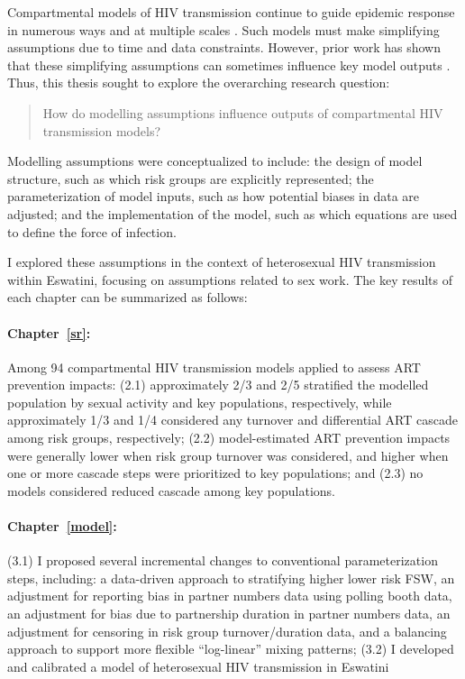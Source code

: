Compartmental models of HIV transmission
continue to guide epidemic response in numerous ways and at multiple scales
\cite{Stover2021,Phillips2022,TenBrink2022}.
Such models must make simplifying assumptions due to time and data constraints.
However, prior work has shown that these simplifying assumptions
can sometimes influence key model outputs
\cite{Hontelez2013,Johnson2016mf,Suen2017,Knight2020}.
Thus, this thesis sought to explore the overarching research question:
\begin{quote}
  How do modelling assumptions influence outputs of compartmental HIV transmission models?
\end{quote}
Modelling assumptions were conceptualized to include:
the design of model structure, such as which risk groups are explicitly represented;
the parameterization of model inputs, such as how potential biases in data are adjusted; and
the implementation of the model, such as which equations are used to define the force of infection.
\par
I explored these assumptions in the context of heterosexual HIV transmission within Eswatini,
focusing on assumptions related to sex work.
The key results of each chapter can be summarized as follows:
\newcommand{\chpar}[1]{\paragraph{Chapter~\ref{#1}: \nameref*{#1}}}
\chpar{sr}
Among 94 compartmental HIV transmission models
applied to assess ART prevention impacts:
(2.1) approximately 2/3 and 2/5 stratified the modelled population
by sexual activity and key populations, respectively, while
approximately 1/3 and 1/4 considered
any turnover and differential ART cascade among risk groups, respectively;
(2.2) model-estimated ART prevention impacts were generally
lower when risk group turnover was considered, and
higher when one or more cascade steps were prioritized to key populations; and
(2.3) no models considered reduced cascade among key populations.
\chpar{model}
(3.1) I proposed several incremental changes to conventional parameterization steps, including:
a data-driven approach to stratifying higher \vs lower risk FSW,
an adjustment for reporting bias in partner numbers data using polling booth data,
an adjustment for bias due to partnership duration in partner numbers data,
an adjustment for censoring in risk group turnover/duration data, and
a balancing approach to support more flexible ``log-linear'' mixing patterns;
(3.2) I developed and calibrated a model of heterosexual HIV transmission in Eswatini
